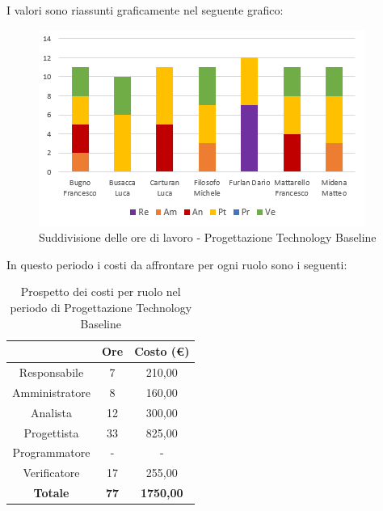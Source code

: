 I valori sono riassunti graficamente nel seguente grafico:

\begin{figure}[H]
  \centering
  \includegraphics[scale=1.2]{immagini/ore_lavoro_TB.png}
  \caption{Suddivisione delle ore di lavoro - Progettazione Technology Baseline}
\end{figure}

\pagebreak
In questo periodo i costi da affrontare per ogni ruolo sono i seguenti:

\begin{table}[H]
  \centering
  \renewcommand{\arraystretch}{1.8}
  \begin{tabular}{c|c|c}
    \rowcolor[HTML]{125E28}
    \multicolumn{1}{c}{\color[HTML]{FFFFFF}\textbf{Ruolo}}
                    & \multicolumn{1}{c}{\color[HTML]{FFFFFF}\textbf{Ore}}
                    & \multicolumn{1}{c}{\color[HTML]{FFFFFF}\textbf{Costo (€)}}                    \\
    \hline
    Responsabile    & 7                                                          & 210,00           \\
    Amministratore  & 8                                                          & 160,00           \\
    Analista        & 12                                                         & 300,00           \\
    Progettista     & 33                                                         & 825,00           \\
    Programmatore   & -                                                          & -                \\
    Verificatore    & 17                                                         & 255,00           \\
    \textbf{Totale} & \textbf{77}                                                & \textbf{1750,00}
  \end{tabular}
  \caption{Prospetto dei costi per ruolo nel periodo di Progettazione Technology Baseline}
\end{table}

